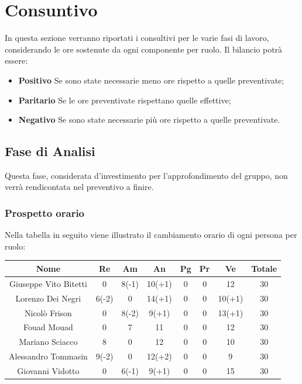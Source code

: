 \section{Consuntivo}
		In questa sezione verranno riportati i consultivi per le varie fasi di lavoro, considerando le ore sostenute da ogni componente per ruolo. Il bilancio potrà essere:
		\begin{itemize}
			\item \textbf{Positivo} Se sono state necessarie meno ore rispetto a quelle preventivate;	 
			\item \textbf{Paritario} Se le ore preventivate rispettano quelle effettive;	 
			\item \textbf{Negativo}	Se sono state necessarie più ore rispetto a quelle preventivate.
		\end{itemize}
	\subsection{Fase di Analisi}
		Questa fase, considerata d'investimento per l'approfondimento del gruppo, non verrà rendicontata nel preventivo a finire. 
		\subsubsection{Prospetto orario}
			Nella tabella in seguito viene illustrato il cambiamento orario di ogni persona per ruolo:
			
			\begin{longtable}{|c|c|c|c|c|c|c|c}
				\hline
				\rowcolor{lighter-grayer}
				\textbf{Nome} & \textbf{Re} & \textbf{Am} & \textbf{An} & \textbf{Pg}  & \textbf{Pr}   & \textbf{Ve} & \textbf{Totale} \\
				\hline
				\endfirsthead
				
				\hline
				Giuseppe Vito Bitetti 		& 0 & 8(-1) & 10(+1) & 0 & 0 & 12 & 30\\
				\hline
				\hline
				Lorenzo Dei Negri			 & 6(-2) & 0 & 14(+1) & 0 & 0 & 10(+1) & 30\\
				\hline
				\hline
				Nicolò Frison 					& 0 & 8(-2) & 9(+1) & 0 & 0 & 13(+1) & 30\\
				\hline
				\hline
				Fouad Mouad 				& 0 & 7 & 11 & 0 & 0 & 12 & 30\\
				\hline
				\hline
				Mariano Sciacco 			& 8 & 0 & 12 & 0 & 0 & 10 & 30\\
				\hline
				\hline
				Alessandro Tommasin    & 9(-2) & 0 & 12(+2) & 0 & 0 & 9 & 30\\
				\hline
				\hline
				Giovanni Vidotto 			& 0 & 6(-1) & 9(+1) & 0 & 0 & 15 & 30\\
				\hline 
				
			\end{longtable}
			\pagebreak	
			
